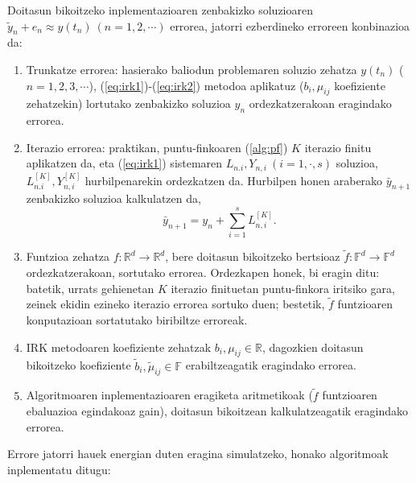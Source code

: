 Doitasun bikoitzeko inplementazioaren zenbakizko soluzioaren $\tilde{y}_n+e_n \approx y(t_n) \ (n=1,2,\cdots)$ errorea, jatorri ezberdineko erroreen konbinazioa da:
\begin{enumerate}
\item Trunkatze errorea: hasierako baliodun problemaren soluzio zehatza $y(t_n)$ ($n=1,2,3,\cdots$), (\ref{eq:irk1})-(\ref{eq:irk2}) metodoa aplikatuz  ($b_i,\mu_{ij}$ koefiziente zehatzekin) lortutako zenbakizko soluzioa $y_n$ ordezkatzerakoan eragindako errorea. 
\item Iterazio errorea: praktikan, puntu-finkoaren (\ref{alg:pf}) $K$ iterazio finitu aplikatzen da, eta (\ref{eq:irk1}) sistemaren $L_{n.i}, Y_{n,i} \ (i=1,\cdot,s)$ soluzioa, $L_{n.i}^{[K]}, Y_{n,i}^{[K]}$ hurbilpenarekin ordezkatzen da. Hurbilpen honen araberako $\bar{y}_{n+1}$ zenbakizko soluzioa kalkulatzen da,
\begin{equation*}
\bar{y}_{n+1}=y_{n}+\sum_{i=1}^{s} L_{n,i}^{[K]}.
\end{equation*}   
\item Funtzioa zehatza $f:\mathbb{R}^d \rightarrow \mathbb{R}^d$, bere doitasun bikoitzeko bertsioaz $\tilde{f}:\mathbb{F}^d \rightarrow \mathbb{F}^d$ ordezkatzerakoan, sortutako errorea.  Ordezkapen honek, bi eragin ditu: batetik, urrats gehienetan $K$ iterazio finituetan puntu-finkora iritsiko gara, zeinek  ekidin ezineko iterazio errorea sortuko duen; bestetik, $\tilde{f}$ funtzioaren konputazioan sortatutako biribiltze erroreak. 
\item IRK metodoaren koefiziente zehatzak $b_i,\mu_{ij} \in \mathbb{R}$, dagozkien doitasun bikoitzeko koefiziente $\tilde{b}_i,\tilde{\mu}_{ij} \in \mathbb{F}$ erabiltzeagatik eragindako errorea.
\item Algoritmoaren inplementazioaren eragiketa aritmetikoak ($\tilde{f}$ funtzioaren ebaluazioa egindakoaz gain), doitasun bikoitzean kalkulatzeagatik eragindako errorea.  
\end{enumerate} 

Errore jatorri hauek energian duten eragina simulatzeko, honako algoritmoak inplementatu ditugu:

